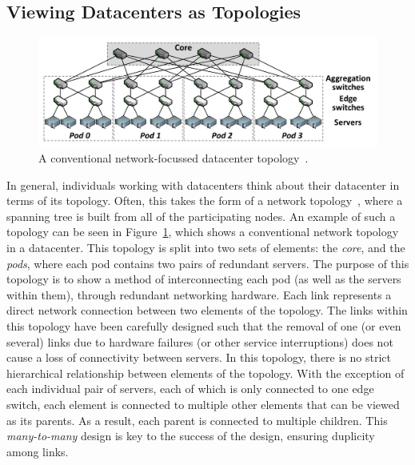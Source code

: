 \documentclass[11pt]{article}
\begin{document}
	\subsection{Viewing Datacenters as Topologies}
		\begin{figure}[]
			\centering
			\includegraphics[width=\textwidth]{couto2012/Fat-tree-with-4-port-switches-n-4.png}
			\caption[A conventional network-focussed datacenter topology]{A conventional network-focussed datacenter topology~\cite{Couto2012}.}
			\label{fig:networktopology}
		\end{figure}
		In general, individuals working with datacenters think about their datacenter in terms of its topology. 
		Often, this takes the form of a network topology~\cite{Couto2012}, where a spanning tree is built from all of the participating nodes.
		An example of such a topology can be seen in Figure~\ref{fig:networktopology}, which shows a conventional network topology in a datacenter.
		This topology is split into two sets of elements: the \textit{core}, and the \textit{pods}, where each pod contains two pairs of redundant servers.
		The purpose of this topology is to show a method of interconnecting each pod (as well as the servers within them), through redundant networking hardware.
		Each link represents a direct network connection between two elements of the topology.
		The links within this topology have been carefully designed such that the removal of one (or even several) links due to hardware failures (or other service interruptions) does not cause a loss of connectivity between servers.
		In this topology, there is no strict hierarchical relationship between elements of the topology.
		With the exception of each individual pair of servers, each of which is only connected to one edge switch, each element is connected to multiple other elements that can be viewed as its parents. As a result, each parent is connected to multiple children. This \textit{many-to-many} design is key to the success of the design, ensuring duplicity among links.
\end{document}
